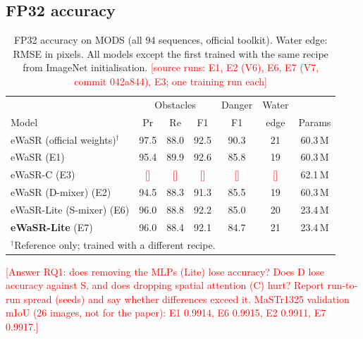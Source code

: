 \documentclass[conference]{IEEEtran}
\newcommand{\tbd}[1]{\textcolor{red}{[#1]}}
\begin{document}
\subsection{FP32 accuracy}
\label{sec:fp32}
\begin{table}[t]
\centering
\caption{FP32 accuracy on MODS (all 94 sequences, official toolkit). Water edge: RMSE in pixels. All models except the first trained with the same recipe from ImageNet initialisation. \tbd{source runs: E1, E2 (V6), E6, E7 (V7, commit 042a844), E3; one training run each}}
\label{tab:fp32}
\setlength{\tabcolsep}{3.5pt}
\begin{tabular}{lcccccc}
\toprule
& \multicolumn{3}{c}{Obstacles} & Danger & Water & \\
Model & Pr & Re & F1 & F1 & edge & Params \\
\midrule
eWaSR (official weights)$^\dagger$ & 97.5 & 88.0 & 92.5 & 90.3 & 21 & 60.3\,M \\
\midrule
eWaSR (E1)                & 95.4 & 89.9 & 92.6 & 85.8 & 19 & 60.3\,M \\
eWaSR-C (E3)              & \tbd{} & \tbd{} & \tbd{} & \tbd{} & \tbd{} & 62.1\,M \\
eWaSR (D-mixer) (E2)      & 94.5 & 88.3 & 91.3 & 85.5 & 19 & 60.3\,M \\
eWaSR-Lite (S-mixer) (E6) & 96.0 & 88.8 & 92.2 & 85.0 & 20 & 23.4\,M \\
\textbf{eWaSR-Lite} (E7)  & 96.0 & 88.4 & 92.1 & 84.7 & 21 & 23.4\,M \\
\bottomrule
\multicolumn{7}{l}{\footnotesize $^\dagger$Reference only; trained with a different recipe.}
\end{tabular}
\end{table}
\tbd{Answer RQ1: does removing the MLPs (Lite) lose accuracy? Does D lose accuracy against S, and does dropping spatial attention (C) hurt? Report run-to-run spread (seeds) and say whether differences exceed it. MaSTr1325 validation mIoU (26 images, not for the paper): E1 0.9914, E6 0.9915, E2 0.9911, E7 0.9917.}
\end{document}
